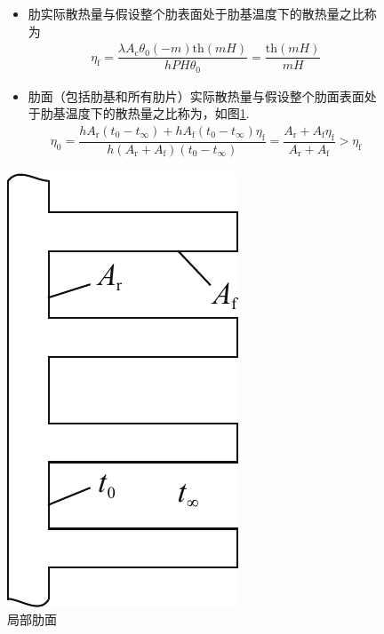 \begin{figure}[!htb]
\begin{minipage}{0.73\linewidth}
\begin{itemize}
				\item 肋实际散热量与假设整个肋表面处于肋基温度下的散热量之比称为
				\begin{align}
					\eta_{\text{f}} = \dfrac{\lambda A_{\text{c}} \theta_0 (-m) \text{th}(mH)}{h P H \theta_0} = \dfrac{\text{th}(mH)}{mH}
				\end{align}
				\item 肋面（包括肋基和所有肋片）实际散热量与假设整个肋面表面处于肋基温度下的散热量之比称为，如图\ref{总肋面效率图}.
				\begin{align}
					\eta_0 = \dfrac{hA_{\text{r}}(t_0 - t_{\infty}) + hA_{\text{f}}(t_0 - t_{\infty})\eta_\text{f}}{h(A_{\text{r}}+A_{\text{f}})(t_0 - t_{\infty}) } =\dfrac{A_{\text{r}} + A_{\text{f}}\eta_\text{f}}{A_{\text{r}}+A_{\text{f}} }  > \eta_{\text{f}} 
				\end{align}
		\end{itemize}
		\end{minipage}
		\begin{minipage}{0.27\linewidth}
			\vspace*{-0.5em}
			\centering
			\includegraphics[width=0.6\linewidth]{pic/总肋面效率.pdf}
			\vspace*{-1.5em}
			\caption{局部肋面}
			\label{总肋面效率图}
		\end{minipage}
	\end{figure}
	

